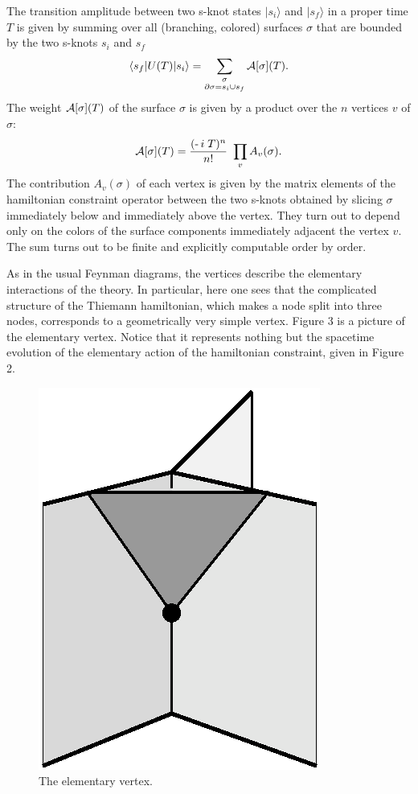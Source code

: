 \documentclass[12pt]{article}
\begin{document}
The transition amplitude between two s-knot states 
$|s_{i}\rangle$ and $|s_{f}\rangle$ in a proper time $T$ is given 
by summing over all (branching, colored) surfaces $\sigma$ 
that are bounded by the two s-knots $s_{i}$ and $s_{f}$ 
 \begin{equation}
\langle s_{f}|U(T)|s_{i}\rangle  =
\sum_{\stackrel{\scriptstyle\sigma}
{\scriptstyle\partial\sigma=s_i\cup s_f}}
 {\cal A}[\sigma](T)
\label{uno}. 
 \end{equation}
The weight ${\cal A}[\sigma](T)$ of the surface $\sigma$ is given 
by a product over the $n$ vertices $v$ of $\sigma$: 
\begin{equation} 
{\cal A}[\sigma](T)= {(\mbox{\rm - 
}\!i\;T)^{n}\over n!}\ \prod_{v} A_v(\sigma).
\label{due}
\end{equation} 
The contribution $A_v(\sigma)$ of each vertex is given by the 
matrix elements of the hamiltonian constraint operator between the 
two s-knots obtained by slicing $\sigma$ immediately below and 
immediately above the vertex.  They turn out to depend only on the 
colors of the surface components immediately adjacent the vertex 
$v$.  The sum turns out to be finite and explicitly computable 
order by order.

As in the usual Feynman diagrams, the vertices describe the 
elementary interactions of the theory.  In particular, here one 
sees that the complicated structure of the Thiemann hamiltonian, 
which makes a node split into three nodes, corresponds to a 
geometrically very simple vertex.  Figure 3 is a picture of the 
elementary vertex.  Notice that it represents nothing but the 
spacetime evolution of the elementary action of the hamiltonian 
constraint, given in Figure 2.

\begin{figure} 
\centerline{\mbox{\includegraphics{RovelliFig2.eps}}} 
\caption{The elementary vertex.} 
\end{figure}
\end{document}

